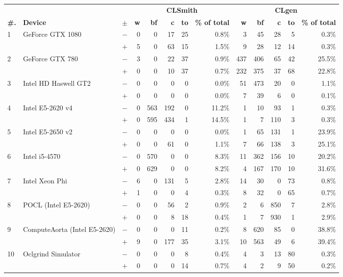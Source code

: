   \begin{tabular}{lll | rrrrr | rrrrr }
  \toprule
  & & & \multicolumn{5}{c|}{\textbf{CLSmith}} & \multicolumn{5}{c}{\textbf{CLgen}} \\
  \textbf{\#.} & \textbf{Device} & $\pm$ &
  \textbf{w} & \textbf{bf} & \textbf{c} & \textbf{to} & \textbf{\% of total} &
  \textbf{w} & \textbf{bf} & \textbf{c} & \textbf{to} & \textbf{\% of total} \\
  \midrule
  \multirow{ 2}{*}{1} & \multirow{ 2}{*}{GeForce GTX 1080} & $-$ & 0 & 0 & 17 & 25 & 0.8\%       & 3 & 45 & 28 & 5 & 0.3\% \\& & $+$ & 5 & 0 & 63 & 15 & 1.5\% & 9 & 28 & 12 & 14 & 0.3\% \\
\hline
\multirow{ 2}{*}{2} & \multirow{ 2}{*}{GeForce GTX 780} & $-$ & 3 & 0 & 22 & 37 & 0.9\%       & 437 & 406 & 65 & 42 & 25.5\% \\& & $+$ & 0 & 0 & 10 & 37 & 0.7\% & 232 & 375 & 37 & 68 & 22.8\% \\
\hline
\multirow{ 2}{*}{3} & \multirow{ 2}{*}{Intel HD Haswell GT2} & $-$ & 0 & 0 & 0 & 0 & 0.0\%       & 51 & 473 & 20 & 0 & 1.1\% \\& & $+$ & 0 & 0 & 0 & 0 & 0.0\% & 7 & 39 & 6 & 0 & 0.1\% \\
\hline
\multirow{ 2}{*}{4} & \multirow{ 2}{*}{Intel E5-2620 v4} & $-$ & 0 & 563 & 192 & 0 & 11.2\%       & 1 & 10 & 93 & 1 & 0.3\% \\& & $+$ & 0 & 595 & 434 & 1 & 14.5\% & 1 & 7 & 110 & 3 & 0.3\% \\
\hline
\multirow{ 2}{*}{5} & \multirow{ 2}{*}{Intel E5-2650 v2} & $-$ & 0 & 0 & 0 & 0 & 0.0\%       & 1 & 65 & 131 & 1 & 23.9\% \\& & $+$ & 0 & 0 & 61 & 0 & 1.1\% & 7 & 66 & 138 & 3 & 25.1\% \\
\hline
\multirow{ 2}{*}{6} & \multirow{ 2}{*}{Intel i5-4570} & $-$ & 0 & 570 & 0 & 0 & 8.3\%       & 11 & 362 & 156 & 10 & 20.2\% \\& & $+$ & 0 & 629 & 0 & 0 & 8.2\% & 4 & 167 & 170 & 10 & 31.6\% \\
\hline
\multirow{ 2}{*}{7} & \multirow{ 2}{*}{Intel Xeon Phi} & $-$ & 6 & 0 & 131 & 5 & 2.8\%       & 14 & 30 & 0 & 73 & 0.8\% \\& & $+$ & 1 & 0 & 0 & 4 & 0.3\% & 8 & 32 & 0 & 65 & 0.7\% \\
\hline
\multirow{ 2}{*}{8} & \multirow{ 2}{*}{POCL (Intel E5-2620)} & $-$ & 0 & 0 & 56 & 2 & 0.9\%       & 2 & 6 & 850 & 7 & 2.8\% \\& & $+$ & 0 & 0 & 8 & 18 & 0.4\% & 1 & 7 & 930 & 1 & 2.9\% \\
\hline
\multirow{ 2}{*}{9} & \multirow{ 2}{*}{ComputeAorta (Intel E5-2620)} & $-$ & 0 & 0 & 0 & 11 & 0.2\%       & 8 & 620 & 85 & 0 & 38.8\% \\& & $+$ & 9 & 0 & 177 & 35 & 3.1\% & 10 & 563 & 49 & 6 & 39.4\% \\
\hline
\multirow{ 2}{*}{10} & \multirow{ 2}{*}{Oclgrind Simulator} & $-$ & 0 & 0 & 0 & 8 & 0.4\%       & 4 & 3 & 13 & 80 & 0.3\% \\& & $+$ & 0 & 0 & 0 & 14 & 0.7\% & 4 & 2 & 9 & 50 & 0.2\% \\
  \bottomrule
\end{tabular}

